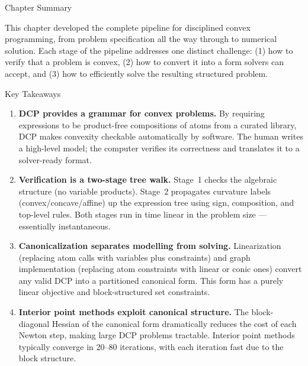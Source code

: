 \documentclass[aspectratio=169,10pt]{beamer}
\begin{document}
\begin{frame}[allowframebreaks]{Chapter Summary}

  This chapter developed the complete pipeline for disciplined convex
  programming, from problem specification all the way through to
  numerical solution.  Each stage of the pipeline addresses one distinct
  challenge: (1) how to verify that a problem is convex, (2) how to
  convert it into a form solvers can accept, and (3) how to efficiently
  solve the resulting structured problem.

  \begin{block}{Key Takeaways}
    \begin{enumerate}
      \item \textbf{DCP provides a grammar for convex problems.}
            By requiring expressions to be product-free compositions of
            atoms from a curated library, DCP makes convexity
            checkable automatically by software.  The human writes a
            high-level model; the computer verifies its correctness and
            translates it to a solver-ready format.

      \item \textbf{Verification is a two-stage tree walk.}  Stage~1
            checks the algebraic structure (no variable products).
            Stage~2 propagates curvature labels (convex/concave/affine)
            up the expression tree using sign, composition, and
            top-level rules.  Both stages run in time linear in the
            problem size --- essentially instantaneous.

      \item \textbf{Canonicalization separates modelling from solving.}
            Linearization (replacing atom calls with variables plus
            constraints) and graph implementation (replacing atom
            constraints with linear or conic ones) convert any valid
            DCP into a partitioned canonical form.  This form has a
            purely linear objective and block-structured set constraints.

      \item \textbf{Interior point methods exploit canonical structure.}
            The block-diagonal Hessian of the canonical form
            dramatically reduces the cost of each Newton step, making
            large DCP problems tractable.  Interior point methods
            typically converge in 20--80 iterations, with each
            iteration fast due to the block structure.


\end{enumerate}
\end{block}
\end{frame}
\end{document}
